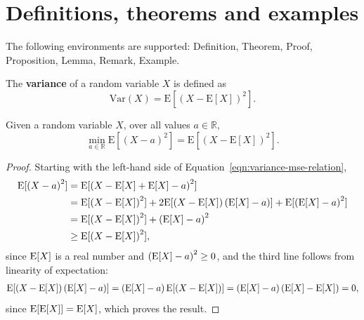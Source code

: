 \section{Definitions, theorems and examples}
\label{sec:defnthms}

The following environments are supported:
Definition, Theorem, Proof, Proposition, Lemma, Remark, Example.

\begin{definition} \label{defn:variance}
    The \textbf{variance} of a random variable $X$ is defined as
    \begin{equation} \label{eqn:variance-definition}
        \mathrm{Var}(X) = \mathrm{E}[(X - \mathrm{E}[X])^2].
    \end{equation}
\end{definition}

\begin{theorem} \label{thm:variance-mse-relation}
Given a random variable $X$, over all values $a \in \mathbb{R}$, 
\begin{equation}
    \min_{a \in \mathbb{R}} \mathrm{E}[(X - a)^2] 
    = \mathrm{E}[(X - \mathrm{E}[X])^2].
    \label{eqn:variance-mse-relation}
\end{equation}
\end{theorem}

\begin{proof}   
    Starting with the left-hand side of Equation~\eqref{eqn:variance-mse-relation},
\begin{align}
\mathrm{E} [  \left( X - a \right)^2  ] 
&=  \mathrm{E} [   \left( X - \mathrm{E} [ X ] + \mathrm{E} [ X ] - a \right)^2  ] 
    \nonumber \\
&=  \mathrm{E} [   \left(  X - \mathrm{E} [ X ]  \right)^2  ] 
    + 2 \mathrm{E} [  \left(  X - \mathrm{E} [ X ]  \right) \left(  \mathrm{E} [ X ] - a \right)  ] +  
  \mathrm{E} [  \left(  \mathrm{E} [ X ] - a \right)^2   ]    
    \nonumber \\
&=  \mathrm{E} [   \left(  X - \mathrm{E} [ X ]  \right)^2  ] +  \left(  \mathrm{E} [ X ] - a \right)^2
    \nonumber \\
& \geq \mathrm{E} [   \left(  X - \mathrm{E} [ X ]  \right)^2  ],  
\nonumber 
\end{align}
since $\mathrm{E} [ X ]$ is a real number and $\left(  \mathrm{E} [ X ] - a \right)^2 \geq 0$,
and the third line follows from linearity of expectation:
%
\begin{align}
    \mathrm{E} [  \left(  X - \mathrm{E} [ X ]  \right) \left(  \mathrm{E} [ X ] - a \right)  ]
    =
    \left(  \mathrm{E} [ X ] - a \right) \mathrm{E} [  \left(  X - \mathrm{E} [ X ]  \right)  ]
    =
    \left(  \mathrm{E} [ X ] - a \right)  \left( \mathrm{E} [  X ] - \mathrm{E} [ X ]  \right) 
    =
    0,
    \nonumber
\end{align}
%
since $\mathrm{E} [ \mathrm{E} [ X ] ] = \mathrm{E} [ X ]$, which proves the result.
\end{proof}

